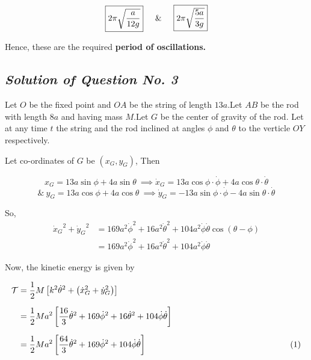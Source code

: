 \documentclass[12pt, a4paper]{article} %
\begin{document}
\begin{align*}
    \boxed{2 \pi \sqrt{\frac{a}{12g}}}
    \hspace*{5mm} \mbox{\&}\hspace*{5mm} \boxed{2 \pi \sqrt{\frac{5a}{3g}}}
\end{align*}

Hence, these are the required {\bf period of oscillations.}

\BgThispage

\pagebreak


\subsection{\slshape Solution of Question No. 3}

Let $O$ be the fixed point and $OA$ be the string of length $13a$.Let
$AB$ be the rod with length $8a$ and having mass $M$.Let $G$ be the center of gravity of the rod.
Let at any time $t$ the string and the rod inclined at angles $\phi$ and $\theta$ to the verticle $OY$ respectively.



\begin{center}
    \def\svgwidth{10cm}
    
\end{center}

Let co-ordinates of $G$ be $\left(x_G, y_G\right)$, Then

\[x_G = 13a\sin\phi + 4a\sin\theta\ \implies \dot{x}_G = 13a\cos\phi\cdot\dot{\phi} + 4a\cos\theta\cdot\dot{\theta}\]
\[\mbox{\&}\ y_G = 13a\cos\phi + 4a\cos\theta\ \implies \dot{y}_G = -13a\sin\phi\cdot\dot{\phi} - 4a\sin\theta\cdot\dot{\theta}\]

So,
\begin{equation*}
    \begin{split}
        {\dot{x}_G}^2 + {\dot{y}_G}^2 & = 169a^2\dot{\phi}^2 + 16a^2\dot{\theta}^2 + 104a^2\dot{\phi}\dot{\theta}\cos(\theta - \phi)\\[2mm]
        & = 169a^2\dot{\phi}^2 + 16a^2\dot{\theta}^2 + 104a^2\dot{\phi}\dot{\theta}
    \end{split}
\end{equation*}

Now, the kinetic energy is given by 

\begin{equation*}
    \begin{split}
        \mathcal{T} & = \frac{1}{2}M\left[k^2\dot{\theta}^2 + \left({\dot{x}_G}^2 + {\dot{y}_G}^2\right)\right]\\[2mm]
        & = \frac{1}{2}Ma^2\left[\frac{16}{3}\dot{\theta}^2 + 169\dot{\phi}^2 + 16\dot{\theta}^2 + 104\dot{\phi}\dot{\theta}\right]\\[2mm]
        & = \frac{1}{2}Ma^2\left[\frac{64}{3}\dot{\theta}^2 + 169\dot{\phi}^2  + 104\dot{\phi}\dot{\theta}\right]\hspace*{6cm}(1) 
    \end{split}
\end{equation*}
\end{document}
